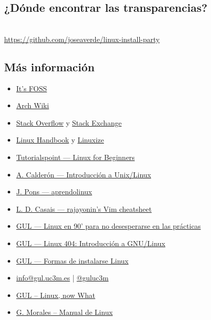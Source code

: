 \documentclass[aspectratio=43]{beamer}
\begin{document}
    \subsection{¿Dónde encontrar las transparencias?}
    \begin{frame}[plain]{\subsecname}
        \centering{}
        \hphantom{}\\
        \url{https://github.com/joseaverde/linux-install-party}
    \end{frame}
    \subsection{Más información}
    \begin{frame}{\secname}{\subsecname}
        \begin{itemize}
            \item \href{https://itsfoss.com/}{It's FOSS}
            \item \href{https://wiki.archlinux.org/}{Arch Wiki}
            \item \href{https://stackoverflow.com/}{Stack Overflow} y \href{https://stackoverflow.com/}{Stack Exchange}
            \item \href{https://stackoverflow.com/}{Linux Handbook} y \href{https://linuxize.com/}{Linuxize}
            \item \href{https://www.tutorialspoint.com/unix/index.htm}{Tutorialspoint — Linux for Beginners}
            \item \href{https://github.com/acaldero/uc3m_linux}{A. Calderón — Introducción a Unix/Linux}
            \item \href{https://aprendolinux.com}{J. Pons — aprendolinux}
            \item \href{https://github.com/rajayonin/cheatsheets/blob/main/vim_cheatsheet.md}{L. D. Casais — rajayonin's Vim cheatsheet}
            \item \href{https://youtu.be/2qZBUa93MQ8}{GUL — Linux en 90' para no desesperarse en las prácticas}
            \item \href{https://cloud-gul.uc3m.es/s/4qXKozr7DmDSZiN}{GUL — Linux 404: Introducción a GNU/Linux}
            \item \href{https://github.com/guluc3m/linux404/blob/main/README.md}{GUL — Formas de instalarse Linux}
            \item \href{mailto:info@gul.uc3m.es}{info@gul.uc3m.es} | \href{https://twitter.com/guluc3m}{@guluc3m}
            \item \href{https://github.com/rajayonin/linux-now-what}{GUL -- Linux, now What}
            \item \href{https://github.com/gmorales08/ManualLinux/blob/master/MANUAL_LINUX}{G. Morales -- Manual de Linux}
        \end{itemize}
    \end{frame}
\end{document}

